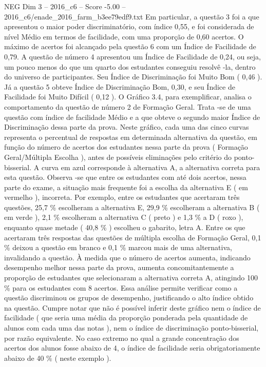\begin{textsample}{NEG Dim 3 – 2016\_c6 – Score -5.00 – 2016\_c6/enade\_2016\_farm\_b3ee79edf9.txt}
Em particular, a questão 3 foi a que apresentou o maior poder discriminatório, com índice 0,55, e foi considerada de nível Médio em termos de facilidade, com uma proporção de 0,60 acertos.
O máximo de acertos foi alcançado pela questão 6 com um Índice de Facilidade de 0,79.
A questão de número 4 apresentou um Índice de Facilidade de 0,24, ou seja, um pouco menos do que um quarto dos estudantes conseguiu resolvê -la, dentro do universo de participantes.
Seu Índice de Discriminação foi Muito Bom ( 0,46 ).
Já a questão 5 obteve Índice de Discriminação Bom, 0,30, e seu Índice de Facilidade foi Muito Difícil ( 0,12 ).
O Gráfico 3.4, para exemplificar, analisa o comportamento da questão de número 2 de Formação Geral.
Trata -se de uma questão com índice de facilidade Médio e a que obteve o segundo maior Índice de Discriminação dessa parte da prova.
Neste gráfico, cada uma das cinco curvas representa o percentual de respostas em determinada alternativa da questão, em função do número de acertos dos estudantes nessa parte da prova ( Formação Geral/Múltipla Escolha ), antes de possíveis eliminações pelo critério do ponto-bisserial.
A curva em azul corresponde à alternativa A, a alternativa correta para esta questão.
Observa -se que entre os estudantes com até dois acertos, nessa parte do exame, a situação mais frequente foi a escolha da alternativa E ( em vermelho ), incorreta.
Por exemplo, entre os estudantes que acertaram três questões, 25,7 \% escolheram a alternativa E, 29,9 \% escolheram a alternativa B ( em verde ), 2,1 \% escolheram a alternativa C ( preto ) e 1,3 \% a D ( roxo ), enquanto quase metade ( 40,8 \% ) escolheu o gabarito, letra A.
Entre os que acertaram três respostas das questões de múltipla escolha de Formação Geral, 0,1 \% deixou a questão em branco e 0,1 \% marcou mais de uma alternativa, invalidando a questão.
À medida que o número de acertos aumenta, indicando desempenho melhor nessa parte da prova, aumenta concomitantemente a proporção de estudantes que selecionaram a alternativa correta A, atingindo 100 \% para os estudantes com 8 acertos.
Essa análise permite verificar como a questão discriminou os grupos de desempenho, justificando o alto índice obtido na questão.
Cumpre notar que não é possível inferir deste gráfico nem o índice de facilidade ( que seria uma média da proporção ponderada pela quantidade de alunos com cada uma das notas ), nem o índice de discriminação ponto-bisserial, por razão equivalente.
No caso extremo no qual a grande concentração dos acertos dos alunos fosse abaixo de 4, o índice de facilidade seria obrigatoriamente abaixo de 40 \% ( neste exemplo ).

\end{textsample}
